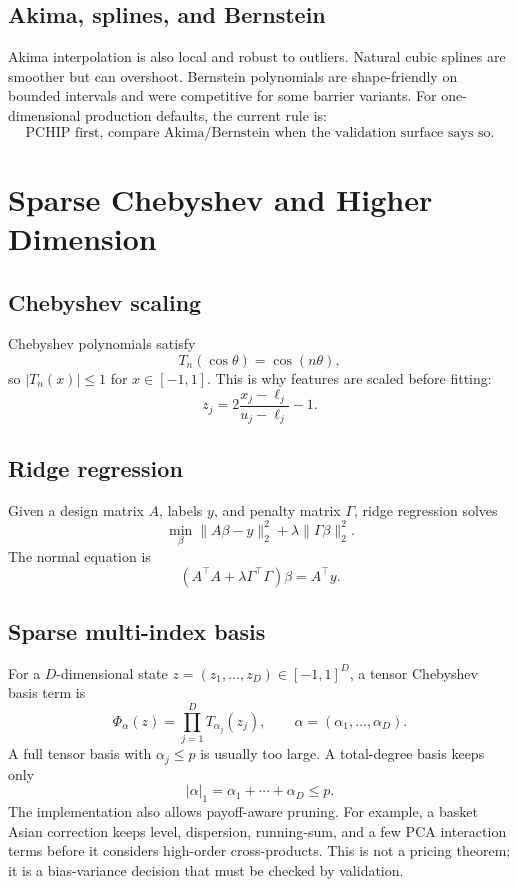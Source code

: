 \documentclass[11pt,oneside]{book}
\theoremstyle{definition}
\begin{document}
\section{Akima, splines, and Bernstein}
Akima interpolation is also local and robust to outliers. Natural cubic splines are smoother but can overshoot. Bernstein polynomials are shape-friendly on bounded intervals and were competitive for some barrier variants. For one-dimensional production defaults, the current rule is:
\[
  \text{PCHIP first, compare Akima/Bernstein when the validation surface says so.}
\]

\chapter{Sparse Chebyshev and Higher Dimension}

\section{Chebyshev scaling}
Chebyshev polynomials satisfy
\[
  T_n(\cos\theta)=\cos(n\theta),
\]
so \(|T_n(x)|\le 1\) for \(x\in[-1,1]\). This is why features are scaled before fitting:
\[
  z_j = 2\frac{x_j-\ell_j}{u_j-\ell_j}-1.
\]

\section{Ridge regression}
Given a design matrix \(A\), labels \(y\), and penalty matrix \(\Gamma\), ridge regression solves
\[
  \min_\beta \|A\beta-y\|_2^2+\lambda\|\Gamma\beta\|_2^2.
\]
The normal equation is
\[
  (A^\top A+\lambda\Gamma^\top\Gamma)\beta=A^\top y.
\]

\section{Sparse multi-index basis}
For a \(D\)-dimensional state \(z=(z_1,\ldots,z_D)\in[-1,1]^D\), a tensor Chebyshev basis term is
\[
  \Phi_\alpha(z)=\prod_{j=1}^D T_{\alpha_j}(z_j),
  \qquad
  \alpha=(\alpha_1,\ldots,\alpha_D).
\]
A full tensor basis with \(\alpha_j\le p\) is usually too large. A total-degree basis keeps only
\[
  |\alpha|_1=\alpha_1+\cdots+\alpha_D\le p.
\]
The implementation also allows payoff-aware pruning. For example, a basket Asian correction keeps level, dispersion, running-sum, and a few PCA interaction terms before it considers high-order cross-products. This is not a pricing theorem; it is a bias-variance decision that must be checked by validation.
\end{document}
